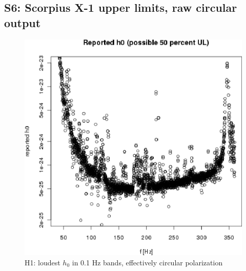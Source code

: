 \subsection{S6: Scorpius X-1 upper limits, raw circular output}

\begin{figure}
\begin{center}
\includegraphics[width=0.68\paperwidth,height=0.48\paperheight]{plots/h0FullUL50log-H1.eps}
\caption{
H1: loudest $h_0$ in 0.1 Hz bands, effectively circular polarization}
\label{S6_H1_raw_output_UL}
\end{center}
\end{figure}

